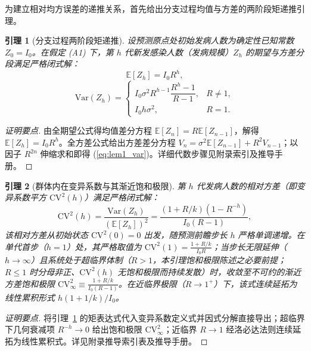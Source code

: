 \documentclass[10pt,a4paper]{article}
\theoremstyle{plain}
\newtheorem{lemma}{引理}
\theoremstyle{definition}
\begin{document}
为建立相对均方误差的递推关系，首先给出分支过程均值与方差的两阶段矩递推引理。

\begin{lemma}[分支过程两阶段矩递推]\label{lem:branch_moments}
设预测原点处初始发病人数为确定性已知常数 $Z_0 = I_0$。在假定 (A1) 下，第 $h$ 代新发感染人数（发病规模）$Z_h$ 的期望与方差分段满足严格闭式解：
\begin{equation}
\mathbb{E}[Z_h] = I_0 R^h,
\end{equation}
\begin{equation}
\text{Var}(Z_h) = \begin{cases}
I_0 \sigma^2 R^{h-1} \dfrac{R^h - 1}{R - 1}, & R \neq 1, \\[8pt]
I_0 h \sigma^2, & R = 1.
\end{cases}
\label{eq:lem1_var}
\end{equation}
\end{lemma}

\begin{proof}[证明要点]
由全期望公式得均值差分方程 $\mathbb{E}[Z_n] = R\mathbb{E}[Z_{n-1}]$，解得 $\mathbb{E}[Z_h]=I_0 R^h$。全方差公式给出方差差分方程 $V_n = \sigma^2 \mathbb{E}[Z_{n-1}] + R^2 V_{n-1}$；以因子 $R^{2n}$ 伸缩求和即得 (\ref{eq:lem1_var})。详细代数步骤见附录索引及推导手册。
\end{proof}

\begin{lemma}[群体内在变异系数与其渐近饱和极限]\label{lem:cv_floor}
第 $h$ 代发病人数的相对方差（即变异系数平方 $\text{CV}^2(h)$）满足严格闭式解：
\begin{equation}
\text{CV}^2(h) = \frac{\text{Var}(Z_h)}{(\mathbb{E}[Z_h])^2} = \frac{(1 + R/k)(1 - R^{-h})}{I_0(R - 1)},
\label{eq:cv_floor}
\end{equation}
该相对方差从初始状态 $\text{CV}^2(0)=0$ 出发，随预测前瞻步长 $h$ 严格单调递增。在单代首步（$h=1$）处，其严格取值为 $\text{CV}^2(1) = \frac{1+R/k}{I_0 R}$；当步长无限延伸（$h \to \infty$）且系统处于超临界体制（$R > 1$，本引理饱和极限陈述之必要前提；$R\le1$ 时分母非正、$\text{CV}^2(h)$ 无饱和极限而持续发散）时，收敛至不可约的渐近方差饱和极限 $\text{CV}^2_\infty \equiv \frac{1 + R/k}{I_0(R - 1)}$。在近临界极限（$R \to 1^+$）下，该式连续延拓为线性累积形式 $h(1+1/k)/I_0$。
\end{lemma}

\begin{proof}[证明要点]
将引理~\ref{lem:branch_moments} 的矩表达式代入变异系数定义式并因式分解直接导出；超临界下几何衰减项 $R^{-h}\to 0$ 给出饱和极限 $\text{CV}^2_\infty$；近临界 $R\to 1$ 经洛必达法则连续延拓为线性累积式。详见附录推导索引表及推导手册。
\end{proof}
\end{document}
